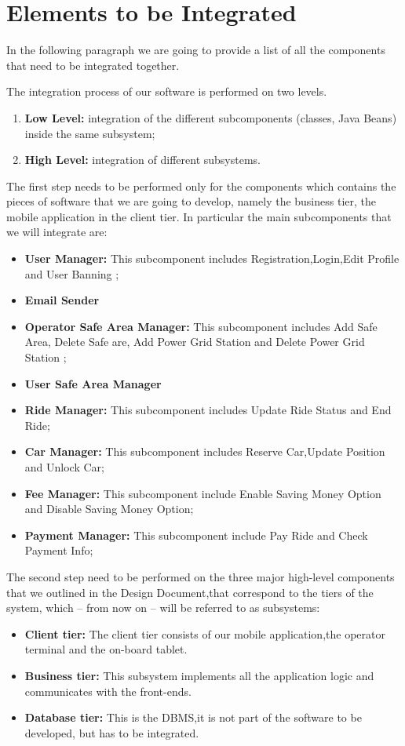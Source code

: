 \section{Elements to be Integrated}
In the following paragraph we are going to provide a list of all the components that need to be integrated together.

The integration process of our software is performed on two levels.
\begin{enumerate}
\item \textbf{Low Level:} integration of the different subcomponents (classes, Java Beans) inside the
same subsystem;
\item \textbf{High Level:} integration of different subsystems.
\end{enumerate}

The first step needs to be performed only for the components which contains
the pieces of software that we are going to develop, namely the business
tier, the mobile application in the client tier.
In particular the main subcomponents  that we will integrate are:
\begin{itemize}
\item \textbf{User Manager:} This subcomponent includes Registration,Login,Edit Profile and User Banning ;
\item \textbf{Email Sender}
\item \textbf{Operator Safe Area Manager:} This subcomponent includes Add Safe Area, Delete Safe are, Add Power Grid Station and Delete Power Grid Station ;
\item \textbf{User Safe Area Manager}
\item \textbf{Ride Manager:} This subcomponent includes Update Ride Status and End Ride;
\item \textbf{Car Manager:} This subcomponent includes Reserve Car,Update Position and Unlock Car;
\item \textbf{Fee Manager:} This subcomponent include Enable Saving Money Option and Disable Saving Money Option;
\item \textbf{Payment Manager:} This subcomponent include Pay Ride and Check Payment Info;
\end{itemize}


The second step need to be performed on the three major high-level components that we outlined in the Design Document,that correspond to the tiers of the system, which – from now on – will
be referred to as subsystems:
\begin{itemize}
\item \textbf{Client tier:} The client tier consists of our mobile application,the operator terminal and the on-board tablet.
\item\textbf{Business tier:} This subsystem implements all the application logic and
communicates with the front-ends.
\item \textbf{Database tier:} This is the DBMS,it is not part of the software to be developed,
but has to be integrated.
\end{itemize}



